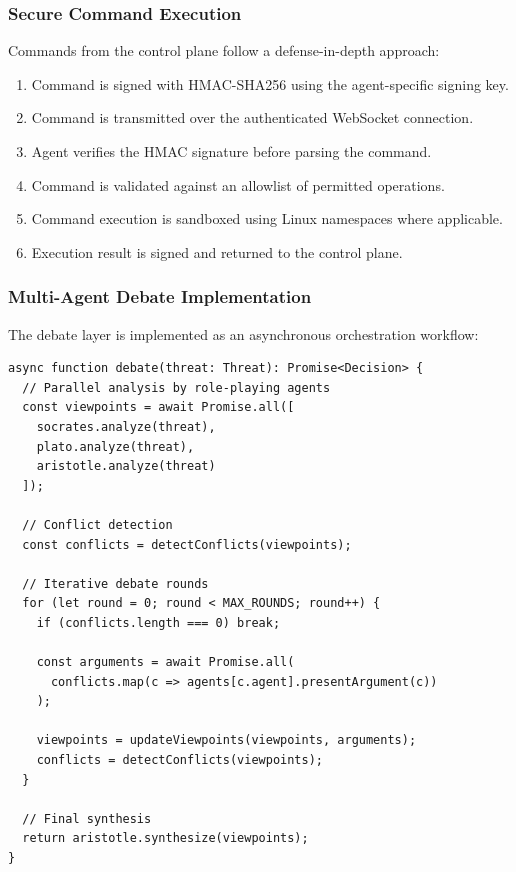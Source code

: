 \subsubsection{Secure Command Execution}

Commands from the control plane follow a defense-in-depth approach:

\begin{enumerate}
    \item Command is signed with HMAC-SHA256 using the agent-specific signing key.
    \item Command is transmitted over the authenticated WebSocket connection.
    \item Agent verifies the HMAC signature before parsing the command.
    \item Command is validated against an allowlist of permitted operations.
    \item Command execution is sandboxed using Linux namespaces where applicable.
    \item Execution result is signed and returned to the control plane.
\end{enumerate}

\subsubsection{Multi-Agent Debate Implementation}

The debate layer is implemented as an asynchronous orchestration workflow:

\begin{verbatim}
async function debate(threat: Threat): Promise<Decision> {
  // Parallel analysis by role-playing agents
  const viewpoints = await Promise.all([
    socrates.analyze(threat),
    plato.analyze(threat),
    aristotle.analyze(threat)
  ]);

  // Conflict detection
  const conflicts = detectConflicts(viewpoints);

  // Iterative debate rounds
  for (let round = 0; round < MAX_ROUNDS; round++) {
    if (conflicts.length === 0) break;

    const arguments = await Promise.all(
      conflicts.map(c => agents[c.agent].presentArgument(c))
    );

    viewpoints = updateViewpoints(viewpoints, arguments);
    conflicts = detectConflicts(viewpoints);
  }

  // Final synthesis
  return aristotle.synthesize(viewpoints);
}
\end{verbatim}

